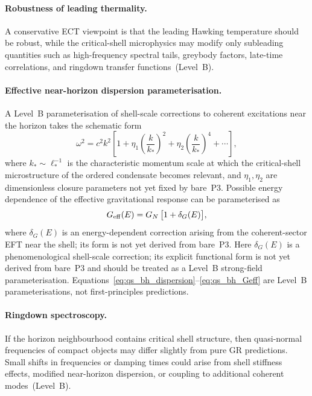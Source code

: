 \paragraph{Robustness of leading thermality.}
A conservative ECT viewpoint is that the leading Hawking temperature
should be robust, while the critical-shell microphysics may modify only
subleading quantities such as high-frequency spectral tails, greybody
factors, late-time correlations, and ringdown transfer functions~(Level~B).

\paragraph{Effective near-horizon dispersion parameterisation.}
A Level~B parameterisation of shell-scale corrections to coherent
excitations near the horizon takes the schematic form
\begin{equation}
  \label{eq:qs_bh_dispersion}
  \omega^2
  = c^2 k^2
  \left[
    1+\eta_1\left(\frac{k}{k_*}\right)^2
    +\eta_2\left(\frac{k}{k_*}\right)^4
    + \cdots
  \right],
\end{equation}
where $k_*\sim\ell_*^{-1}$ is the characteristic momentum scale at
which the critical-shell microstructure of the ordered condensate
becomes relevant, and $\eta_1,\eta_2$ are dimensionless closure
parameters not yet fixed by bare~P3.
Possible energy dependence of the effective gravitational response can
be parameterised as
\begin{equation}
  \label{eq:qs_bh_Geff}
  G_{\rm eff}(E)
  = G_N\,\bigl[1+\delta_G(E)\bigr],
\end{equation}
where $\delta_G(E)$ is an energy-dependent correction arising from the
coherent-sector EFT near the shell; its form is not yet derived from
bare~P3.
Here $\delta_G(E)$ is a phenomenological shell-scale correction;
its explicit functional form is not yet derived from bare~P3 and
should be treated as a Level~B strong-field parameterisation.
Equations~\eqref{eq:qs_bh_dispersion}--\eqref{eq:qs_bh_Geff} are
Level~B parameterisations, not first-principles predictions.

\paragraph{Ringdown spectroscopy.}
If the horizon neighbourhood contains critical shell structure, then
quasi-normal frequencies of compact objects may differ slightly from
pure GR predictions.
Small shifts in frequencies or damping times could arise from shell
stiffness effects, modified near-horizon dispersion, or coupling to
additional coherent modes~(Level~B).

